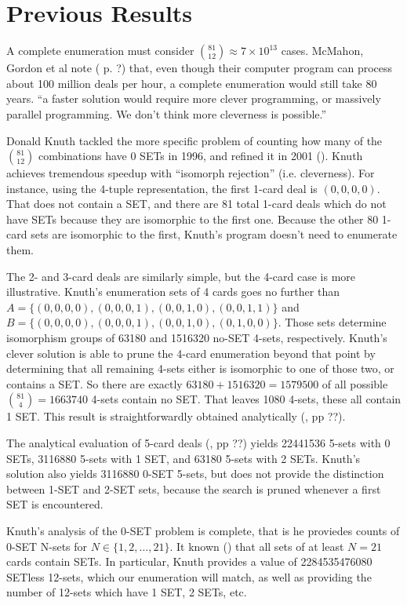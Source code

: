 \documentclass[10pt]{amsart}
\begin{document}
\section{Previous Results}
A complete enumeration must consider $\binom{81}{12} \approx 7\times 10^{13}$
cases. McMahon, Gordon et al note (\cite{JOS} p. ?) that, even though their
computer program can process about 100 million deals per hour, a complete
enumeration would still take 80 years. ``a faster solution would require more
clever programming, or massively parallel programming. We don't think more
cleverness is possible.''

Donald Knuth tackled the more specific problem of counting how many of the
$\binom{81}{12}$ combinations have 0 SETs in 1996, and refined it in 2001
(\cite{SETSET}). Knuth achieves tremendous speedup with ``isomorph rejection''
(i.e. cleverness). For instance, using the 4-tuple representation, the first
1-card deal is $(0,0,0,0)$. That does not contain a SET, and there are 81 total
1-card deals which do not have SETs because they are isomorphic to the first
one. Because the other 80 1-card sets are isomorphic to the first, Knuth's
program doesn't need to enumerate them.

The 2- and 3-card deals are similarly simple, but the 4-card case is more
illustrative. Knuth's enumeration sets of 4 cards goes no further than
$A=\{(0,0,0,0), (0,0,0,1), (0,0,1,0), (0,0,1,1)\}$ and $B=\{(0,0,0,0),
(0,0,0,1), (0,0,1,0), (0,1,0,0)\}$. Those sets determine isomorphism groups of
63180 and 1516320 no-SET 4-sets, respectively. Knuth's clever solution is able
to prune the 4-card enumeration beyond that point by determining that all
remaining 4-sets either is isomorphic to one of those two, or contains a SET. So
there are exactly $63180+1516320=1579500$ of all possible
$\binom{81}{4}=1663740$ 4-sets contain no SET. That leaves 1080 4-sets, these
all contain 1 SET. This result is straightforwardly obtained analytically
(\cite{JOS}, pp ??).

The analytical evaluation of 5-card deals (\cite{JOS}, pp ??) yields 22441536
5-sets with 0 SETs, 3116880 5-sets with 1 SET, and 63180 5-sets with 2
SETs. Knuth's solution also yields 3116880 0-SET 5-sets, but does not provide
the distinction between 1-SET and 2-SET sets, because the search is pruned
whenever a first SET is encountered.

Knuth's analysis of the 0-SET problem is complete, that is he proviedes counts
of 0-SET N-sets for $N\in\{1,2,\ldots,21\}$. It known (\cite{MAXCAP}) that all
sets of at least $N=21$ cards contain SETs. In particular, Knuth provides a
value of 2284535476080 SETless 12-sets, which our enumeration will match, as
well as providing the number of 12-sets which have 1 SET, 2 SETs, etc.
\end{document}
